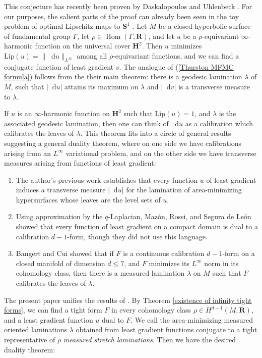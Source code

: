 \documentclass[reqno,11pt]{amsart}
\newcommand{\RR}{\mathbf{R}}
\newcommand{\Hyp}{\mathbf H}
\newcommand{\Sph}{\mathbf S}
\newcommand*\dif{\mathop{}\!\mathrm{d}}
\DeclareMathOperator{\Hom}{Hom}
\newcommand{\Lip}{\mathrm{Lip}}
\newcommand{\dfn}[1]{\emph{#1}\index{#1}}
\theoremstyle{definition}
\numberwithin{equation}{section}
\begin{document}
This conjecture has recently been proven by Daskalopoulos and Uhlenbeck \cite{daskalopoulos2022,uhlenbeck2023noether,daskalopoulos2023}.
For our purposes, the salient parts of the proof can already been seen in the toy problem of optimal Lipschitz maps to $\Sph^1$ \cite{daskalopoulos2020transverse}.
Let $M$ be a closed hyperbolic surface of fundamental group $\Gamma$, let $\rho \in \Hom(\Gamma, \RR)$, and let $u$ be a $\rho$-equivariant $\infty$-harmonic function on the universal cover $\Hyp^2$.
Then $u$ minimizes $\Lip(u) = \|\dif u\|_{L^\infty}$ among all $\rho$-equivariant functions, and we can find a conjugate function of least gradient $v$.
The analogue of (\ref{Thurston MFMC formula}) follows from the their main theorem: there is a geodesic lamination $\lambda$ of $M$, such that $|\dif u|$ attains its maximum on $\lambda$ and $|\dif v|$ is a transverse measure to $\lambda$.

If $u$ is an $\infty$-harmonic function on $\Hyp^2$ such that $\Lip(u) = 1$, and $\lambda$ is the associated geodesic lamination, then one can think of $\dif u$ as a calibration which calibrates the leaves of $\lambda$.
This theorem fits into a circle of general results suggesting a general duality theorem, where on one side we have calibrations arising from an $L^\infty$ variational problem, and on the other side we have transverse measures arising from functions of least gradient:
\begin{enumerate}
\item The author's previous work \cite{BackusCML} establishes that every function $u$ of least gradient induces a transverse measure $|\dif u|$ for the lamination of area-minimizing hypersurfaces whose leaves are the level sets of $u$.
\item Using approximation by the $q$-Laplacian, Maz\'on, Rossi, and Segura de Le\'on \cite{Mazon14} showed that every function of least gradient on a compact domain is dual to a calibration $d - 1$-form, though they did not use this language.
\item Bangert and Cui \cite{bangert_cui_2017} showed that if $F$ is a continuous calibration $d - 1$-form on a closed manifold of dimension $d \leq 7$, and $F$ minimizes its $L^\infty$ norm in its cohomology class, then there is a measured lamination $\lambda$ on $M$ such that $F$ calibrates the leaves of $\lambda$.
\end{enumerate}

The present paper unifies the results of \cite{daskalopoulos2020transverse,bangert_cui_2017}.
By Theorem \ref{existence of infinity tight forms}, we can find a tight form $F$ in every cohomology class $\rho \in H^{d - 1}(M, \RR)$, and a least gradient function $u$ dual to $F$.
We call the area-minimizing measured oriented laminations $\lambda$ obtained from least gradient functions conjugate to a tight representative of $\rho$ \dfn{measured stretch laminations}.
Then we have the desired duality theorem:
\end{document}

